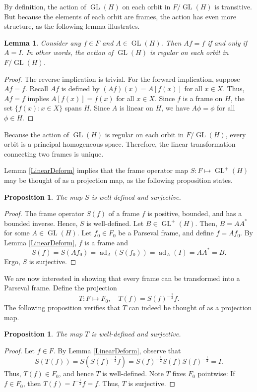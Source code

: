 \documentclass{article}
\newtheorem{lemma}[defn]{Lemma}
\newtheorem{prop}[defn]{Proposition}
\newcommand{\ad}{\operatorname{ad}}
\newcommand{\GL}{\operatorname{GL}}
\begin{document}
By definition, the action of $\GL(H)$ on each orbit in $F/\GL(H)$ is transitive. But because the elements of each orbit are frames, the action has even more structure, as the following lemma illustrates.
\begin{lemma} \label{Regular}
Consider any $f\in F$ and $A\in\GL(H)$. Then $Af=f$ if and only if $A=I$. In other words, the action of $\GL(H)$ is regular on each orbit in $F/\GL(H)$.
\end{lemma}
\begin{proof}
The reverse implication is trivial. For the forward implication, suppose $Af=f$. Recall $Af$ is defined by $(Af)(x) = A[f(x)]$ for all $x\in X$. Thus, $Af=f$ implies $A[f(x)] = f(x)$ for all $x\in X$. Since $f$ is a frame on $H$, the set $\{f(x):x\in X\}$ spans $H$. Since $A$ is linear on $H$, we have $A\phi = \phi$ for all $\phi\in H$. 
\end{proof}

Because the action of $\GL(H)$ is regular on each orbit in $F/\GL(H)$, every orbit is a principal homogeneous space. Therefore, the linear transformation connecting two frames is unique.

Lemma \ref{LinearDeform} implies that the frame operator map $S:F\mapsto \GL^+(H)$ may be thought of as a projection map, as the following proposition states.
\begin{prop}
The map $S$ is well-defined and surjective.
\end{prop}
\begin{proof}
The frame operator $S(f)$ of a frame $f$ is positive, bounded, and has a bounded inverse. Hence, $S$ is well-defined. Let $B\in\GL^+(H)$. Then, $B=AA^*$ for some $A\in\GL(H)$. Let $f_0\in F_0$ be a Parseval frame, and define $f=Af_0$. By Lemma \ref{LinearDeform}, $f$ is a frame and
\[ S(f) = S(Af_0)
= \ad_A(S(f_0))
= \ad_A(I)
= AA^*
= B. \]
Ergo, $S$ is surjective.
\end{proof}

We are now interested in showing that every frame can be transformed into a Parseval frame. Define the projection
\begin{equation}
T:F\mapsto F_0, \quad
T(f) = S(f)^{-\frac{1}{2}}f.
\end{equation}
The following proposition verifies that $T$ can indeed be thought of as a projection map.
\begin{prop}
The map $T$ is well-defined and surjective.
\end{prop}
\begin{proof}
Let $f\in F$. By Lemma \ref{LinearDeform}, observe that
\[ S(T(f)) = S(S(f)^{-\frac{1}{2}}f)
= S(f)^{-\frac{1}{2}}S(f) S(f)^{-\frac{1}{2}}
= I. \]
Thus, $T(f)\in F_0$, and hence $T$ is well-defined. Note $T$ fixes $F_0$ pointwise: If $f\in F_0$, then $T(f)=I^{-\frac{1}{2}}f=f$. Thus, $T$ is surjective.
\end{proof}
\end{document}
